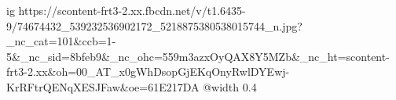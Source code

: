  
 
 
 
 

\ifcmt
  ig https://scontent-frt3-2.xx.fbcdn.net/v/t1.6435-9/74674432_539232536902172_5218875380538015744_n.jpg?_nc_cat=101&ccb=1-5&_nc_sid=8bfeb9&_nc_ohc=559m3azxOyQAX8Y5MZb&_nc_ht=scontent-frt3-2.xx&oh=00_AT_x0gWhDsopGjEKqOnyRwlDYEwj-KrRFtrQENqXESJFaw&oe=61E217DA
  @width 0.4
\fi
